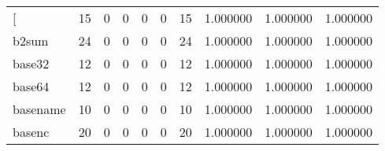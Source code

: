 \begin{longtable}{lrrrrrrrrr}
\bottomrule
\endlastfoot
{[}         &                                      15 &                                                  0 &                                                  0 &                                                  0 &                                                  0 &                                                 15 &                                           1.000000 &                               1.000000 &                             1.000000 \\
b2sum     &                                      24 &                                                  0 &                                                  0 &                                                  0 &                                                  0 &                                                 24 &                                           1.000000 &                               1.000000 &                             1.000000 \\
base32    &                                      12 &                                                  0 &                                                  0 &                                                  0 &                                                  0 &                                                 12 &                                           1.000000 &                               1.000000 &                             1.000000 \\
base64    &                                      12 &                                                  0 &                                                  0 &                                                  0 &                                                  0 &                                                 12 &                                           1.000000 &                               1.000000 &                             1.000000 \\
basename  &                                      10 &                                                  0 &                                                  0 &                                                  0 &                                                  0 &                                                 10 &                                           1.000000 &                               1.000000 &                             1.000000 \\
basenc    &                                      20 &                                                  0 &                                                  0 &                                                  0 &                                                  0 &                                                 20 &                                           1.000000 &                               1.000000 &                             1.000000 \\

\end{longtable}
